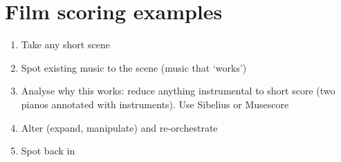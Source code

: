 
\chapter{Film scoring examples}
\label{examples}
\begin{enumerate}
\item Take any short scene
\item Spot existing music to the scene (music that `works')
\item Analyse why this works: reduce anything instrumental to short score (two pianos annotated with instruments). Use Sibelius or Musescore
\item Alter (expand, manipulate) and re-orchestrate
\item Spot back in
\end{enumerate} 



